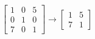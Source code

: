 \documentclass{minimal}
\begin{document}
    $ \left[
    \begin{smallmatrix}
        1 & 0 & 5 \\
        0 & 1 & 0 \\
        7 & 0 & 1
    \end{smallmatrix}
    \right]
    \rightarrow
    \left[
    \begin{smallmatrix}
        1 & 5 \\
        7 & 1
    \end{smallmatrix}
    \right] $
\end{document}
